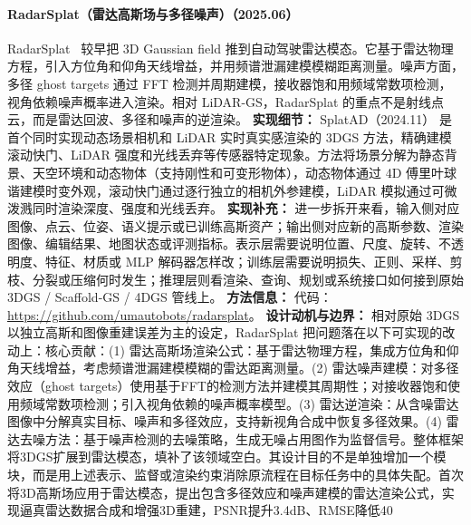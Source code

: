 \paragraph{RadarSplat（雷达高斯场与多径噪声）（2025.06）}
RadarSplat~\cite{2506_01379} 较早把 3D Gaussian field 推到自动驾驶雷达模态。它基于雷达物理方程，引入方位角和仰角天线增益，并用频谱泄漏建模模糊距离测量。噪声方面，多径 ghost targets 通过 FFT 检测并周期建模，接收器饱和用频域常数项检测，视角依赖噪声概率进入渲染。相对 LiDAR-GS，RadarSplat 的重点不是射线点云，而是雷达回波、多径和噪声的逆渲染。
\textbf{实现细节：} SplatAD（2024.11） 是首个同时实现动态场景相机和 LiDAR 实时真实感渲染的 3DGS 方法，精确建模滚动快门、LiDAR 强度和光线丢弃等传感器特定现象。方法将场景分解为静态背景、天空环境和动态物体（支持刚性和可变形物体），动态物体通过 4D 傅里叶球谐建模时变外观，滚动快门通过逐行独立的相机外参建模，LiDAR 模拟通过可微泼溅同时渲染深度、强度和光线丢弃。
\textbf{实现补充：} 进一步拆开来看，输入侧对应图像、点云、位姿、语义提示或已训练高斯资产；输出侧对应新的高斯参数、渲染图像、编辑结果、地图状态或评测指标。表示层需要说明位置、尺度、旋转、不透明度、特征、材质或 MLP 解码器怎样改；训练层需要说明损失、正则、采样、剪枝、分裂或压缩何时发生；推理层则看渲染、查询、规划或系统接口如何接到原始 3DGS / Scaffold-GS / 4DGS 管线上。
\textbf{方法信息：} 代码：\url{https://github.com/umautobots/radarsplat}。
\textbf{设计动机与边界：} 相对原始 3DGS 以独立高斯和图像重建误差为主的设定，RadarSplat 把问题落在以下可实现的改动上：核心贡献：(1) 雷达高斯场渲染公式：基于雷达物理方程，集成方位角和仰角天线增益，考虑频谱泄漏建模模糊的雷达距离测量。(2) 雷达噪声建模：对多径效应（ghost targets）使用基于FFT的检测方法并建模其周期性；对接收器饱和使用频域常数项检测；引入视角依赖的噪声概率模型。(3) 雷达逆渲染：从含噪雷达图像中分解真实目标、噪声和多径效应，支持新视角合成中恢复多径效果。(4) 雷达去噪方法：基于噪声检测的去噪策略，生成无噪占用图作为监督信号。整体框架将3DGS扩展到雷达模态，填补了该领域空白。其设计目的不是单独增加一个模块，而是用上述表示、监督或渲染约束消除原流程在目标任务中的具体失配。首次将3D高斯场应用于雷达模态，提出包含多径效应和噪声建模的雷达渲染公式，实现逼真雷达数据合成和增强3D重建，PSNR提升3.4dB、RMSE降低40%
